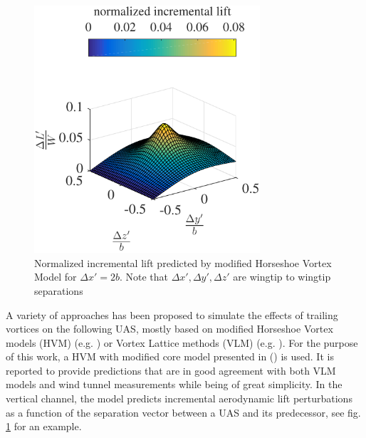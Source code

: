 \documentclass{ifacconf}
\begin{document}
\begin{figure}
\begin{center}
\includegraphics[width=8.4cm]{incrementallift}    %
\caption{Normalized incremental lift predicted by modified Horseshoe Vortex Model for $\Delta x' = 2b$. Note that $\Delta x', \Delta y', \Delta z'$ are wingtip to wingtip separations}
\label{fig:HSVMincrementalift}
\end{center}
\end{figure}
A variety of approaches has been proposed to simulate the effects of trailing vortices on the following UAS, mostly based on modified Horseshoe Vortex models (HVM) (e.g. \cite{Hummel1982}) or Vortex Lattice methods (VLM) (e.g. \cite{Saban2009}). For the purpose of this work, a HVM with modified core model presented in (\cite{dogan2005modeling}) is used. It is reported to provide predictions that are in good agreement with both VLM models and wind tunnel measurements while being of great simplicity. In the vertical channel, the model predicts incremental aerodynamic lift perturbations as a function of the separation vector between a UAS and its predecessor, see fig. \ref{fig:HSVMincrementalift} for an example.
\end{document}
